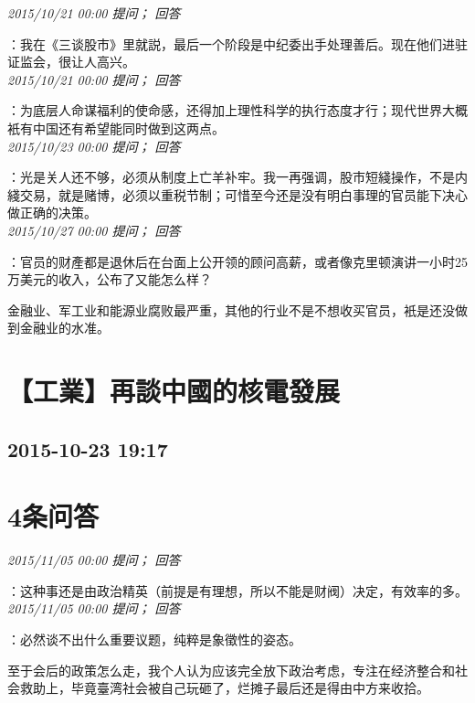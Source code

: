 \documentclass[twocolumn]{ctexart}
\begin{document}
\textit{\hfill\noindent\small 2015/10/21 00:00 提问； 回答}

：我在《三谈股市》里就説，最后一个阶段是中纪委出手处理善后。现在他们进驻证监会，很让人高兴。\\

\textit{\hfill\noindent\small 2015/10/21 00:00 提问； 回答}

：为底层人命谋福利的使命感，还得加上理性科学的执行态度才行；现代世界大概衹有中国还有希望能同时做到这两点。\\

\textit{\hfill\noindent\small 2015/10/23 00:00 提问； 回答}

：光是关人还不够，必须从制度上亡羊补牢。我一再强调，股市短綫操作，不是内綫交易，就是赌博，必须以重税节制；可惜至今还是没有明白事理的官员能下决心做正确的决策。\\

\textit{\hfill\noindent\small 2015/10/27 00:00 提问； 回答}

：官员的财產都是退休后在台面上公开领的顾问高薪，或者像克里顿演讲一小时25万美元的收入，公布了又能怎么样？

金融业、军工业和能源业腐败最严重，其他的行业不是不想收买官员，衹是还没做到金融业的水准。\\


\section{【工業】再談中國的核電發展}
\subsection{2015-10-23 19:17}


\section{4条问答}

\textit{\hfill\noindent\small 2015/11/05 00:00 提问； 回答}

：这种事还是由政治精英（前提是有理想，所以不能是财阀）决定，有效率的多。\\

\textit{\hfill\noindent\small 2015/11/05 00:00 提问； 回答}

：必然谈不出什么重要议题，纯粹是象徵性的姿态。

至于会后的政策怎么走，我个人认为应该完全放下政治考虑，专注在经济整合和社会救助上，毕竟臺湾社会被自己玩砸了，烂摊子最后还是得由中方来收拾。\\
\end{document}
